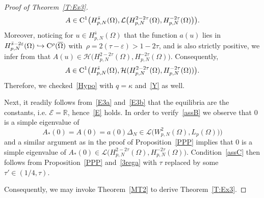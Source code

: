 \documentclass[reqno,11pt]{amsart}
\numberwithin{equation}{section}
\newcommand{\R}{\mathbb{R}}
\newcommand{\ve}{\varepsilon}
\theoremstyle{remark}
\begin{document}
\begin{proof}[Proof of Theorem~\ref{T:Ex3}]
\begin{equation*}
A \in {\rm C}^1\big(H^{\bar s}_{p,N}(\Omega),
\mathcal{L}\big(H^{2-2\tau}_{p,N}(\Omega),H^{-2\tau}_{p,N}(\Omega)\big)\big).
\end{equation*}
Moreover, noticing for $u\in H^{\bar s}_{p,N}(\Omega)$ that the function $a(u)$  lies in~$H^{\bar s-2\ve}_{p,N}(\Omega)\hookrightarrow {\rm C}^\rho(\overline{\Omega})$ with~$\rho=2(\tau-\ve)>1-2\tau$, and is also strictly positive, we infer from \cite[Theorem 8.5]{Am93} that $A(u)\in \mathcal{H}\big(H^{2-2\tau}_{p,N}(\Omega),H^{-2\tau}_{p,N}(\Omega)\big)$. 
Consequently,
\begin{equation}\label{3rega}
A\in{\rm C^{1}}\big(H^{\bar s}_{p,N}(\Omega),\mathcal{H}(H^{2-2\tau}_{p,N}(\Omega),H^{-2\tau}_{p,N}(\Omega))\big).
\end{equation}
Therefore, we checked~\eqref{Hypo} with $q=\kappa$ and~\eqref{Y} as well. 

Next, it readily follows from~\eqref{E3a}
 and~\eqref{E3b} that the equilibria are the constants, i.e. $\mathcal{E}=\R$, hence~\eqref{E} holds.
In order to verify~\eqref{assB} we observe that 0 is a simple eigenvalue of $$A_*(0)=A(0)=a(0)\Delta_N\in \mathcal{L}\big(W_{p,N}^2(\Omega),L_p(\Omega))\big)$$ and a similar argument as in the proof of Proposition~\ref{PPP} implies that 0 is a simple eigenvalue of $A_*(0)\in \mathcal{L}\big(H_{p,N}^{2-2\tau}(\Omega),H_{p,N}^{-2\tau}(\Omega)\big)$. Condition~\eqref{assC} then follows from Proposition~\ref{PPP} and~\eqref{3rega} with $\tau$ replaced by some $\tau'\in (1/4,\tau)$.

Consequently, we may invoke Theorem~\ref{MT2} to derive Theorem~\ref{T:Ex3}.
\end{proof}






\end{document}
